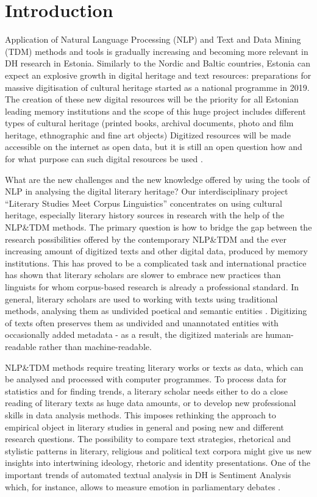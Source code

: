 \documentclass[runningheads]{llncs}
\begin{document}
\section{Introduction}

Application of Natural Language Processing (NLP) and Text and Data Mining (TDM) methods and tools is gradually increasing and becoming more relevant in DH research in Estonia. Similarly to the Nordic and Baltic countries, Estonia can expect an explosive growth in digital heritage and text resources: preparations for massive digitisation of cultural heritage started as a national programme in 2019. The creation of these new digital resources will be the priority for all Estonian leading memory institutions and the scope of this huge project includes different types of cultural heritage (printed books, archival documents, photo and film heritage, ethnographic and fine art objects) \cite{digiteerimine,viireslaak18} Digitized resources will be made accessible on the internet as open data, but it is still an open question how and for what purpose can such digital resources be used \cite{laakviires}. 

What are the new challenges and the new knowledge offered by using the tools of NLP in analysing the digital literary heritage? Our interdisciplinary project ``Literary Studies Meet Corpus Linguistics'' concentrates on using cultural heritage, especially literary history sources in research with the help of the NLP\&TDM methods. The primary question is how to bridge the gap between the research possibilities offered by the contemporary NLP\&TDM and the ever increasing amount of digitized texts and other digital data, produced by memory institutions. This has proved to be a complicated task and international practice has shown that literary scholars are slower to embrace new practices than linguists for whom corpus-based research is already a professional standard. In general, literary scholars are used to working with texts using traditional methods, analysing them as undivided poetical and semantic entities \cite{viireslaak18}. Digitizing of texts often preserves them as undivided and unannotated entities with occasionally added metadata - as a result, the digitized materials are human-readable rather than machine-readable.

NLP\&TDM methods require treating literary works or texts as data, which can be analysed and processed with computer programmes. To process data for statistics and for finding trends, a literary scholar needs either to do a close reading of literary texts as huge data amounts, or to develop new professional skills in data analysis methods. This imposes rethinking the approach to empirical object in literary studies in general and posing new and different research questions. The possibility to compare text strategies, rhetorical and stylistic patterns in literary, religious and political text corpora might give us new insights into intertwining ideology, rhetoric and identity presentations. One of the important trends of automated textual analysis in DH is Sentiment Analysis which, for instance, allows to measure emotion in parliamentary debates \cite{Rheault2016}.
\end{document}
